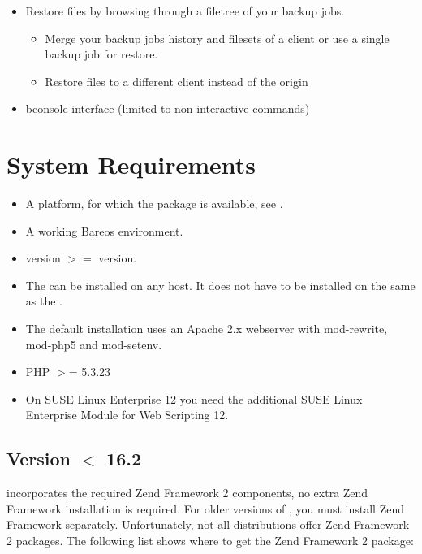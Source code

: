 \begin{itemize}
\begin{itemize}
    \end{itemize}
\item Restore files by browsing through a filetree of your backup jobs.
    \begin{itemize}
    \item Merge your backup jobs history and filesets of a client or use a single backup job for restore.
    \item Restore files to a different client instead of the origin
    \end{itemize}
\item bconsole interface (limited to non-interactive commands)
\end{itemize}

\section{System Requirements}

\begin{itemize}
\item A platform, for which the  package is available, see .
\item A working Bareos environment.
\item \bareosDir version $>=$ \bareosWebui version.
\item The \bareosWebui can be installed on any host. It does not have to be installed on the same as the \bareosDir.
\item The default installation uses an Apache 2.x webserver with mod-rewrite, mod-php5 and mod-setenv.
\item PHP $>$= 5.3.23
\item On SUSE Linux Enterprise 12 you need the additional SUSE Linux Enterprise Module for Web Scripting 12.
\end{itemize}

\subsection{Version $<$ 16.2}

\bareosWebui {} incorporates the required Zend Framework 2 components, no extra Zend Framework installation is required.
For older versions of , you must install Zend Framework separately.
Unfortunately, not all distributions offer Zend Framework 2 packages.
The following list shows where to get the Zend Framework 2 package:

